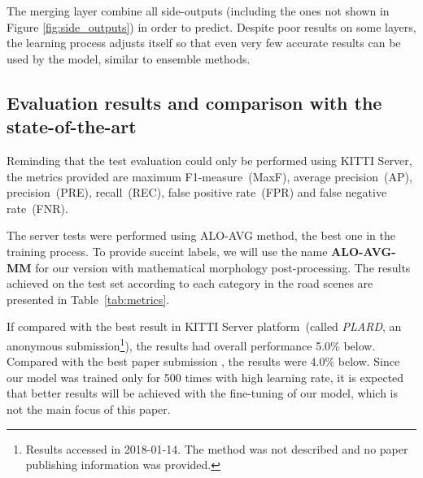 The merging layer combine all side-outputs (including the ones not shown in Figure \ref{fig:side_outputs}) in order to predict. Despite poor results on some layers, the learning process adjusts itself so that even very few accurate results can be used by the model, similar to ensemble methods.


\subsection{Evaluation results and comparison with the state-of-the-art}

Reminding that the test evaluation could only be performed using KITTI Server, the metrics provided are maximum F1-measure~(MaxF), average precision~(AP), precision~(PRE), recall~(REC), false positive rate~(FPR) and false negative rate~(FNR). 

The server tests were performed using ALO-AVG method, the best one in the training process. To provide succint labels, we will use the name \textbf{ALO-AVG-MM} for our version with mathematical morphology post-processing. The results achieved  on the test set according to each category in the road scenes are presented in Table~\ref{tab:metrics}. 

If compared with the best result in KITTI Server platform~(called \textit{PLARD}, an anonymous submission\footnote{Results accessed in 2018-01-14. The method was not described and no paper publishing information was provided.}), the results had overall performance 5.0\% below. Compared with the best paper submission \cite{Caltagirone2018}, the results were 4.0\% below. Since our model was trained only for 500 times with high learning rate, it is expected that better results will be achieved with the fine-tuning of our model, which is not the main focus of this paper. %


